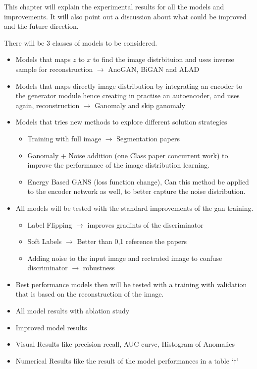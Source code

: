This chapter will explain the experimental results for all the models and improvements. It will also
point out a discussion about what could be improved and the future direction.

There will be 3 classes of models to be considered. 
\begin{itemize}
    \item Models that maps $z$ to $x$ to find the image distrbituion and uses inverse sample for
    reconstruction $\rightarrow$ AnoGAN, BiGAN and ALAD
    \item Models that maps directly image distribution by integrating an encoder to the generator
    module hence creating in practise an autoencoder, and uses again, reconstruction $\rightarrow$
    Ganomaly and skip ganomaly
    \item Models that tries new methods to explore different solution strategies \begin{itemize}
        \item Training with full image $\rightarrow$ Segmentation papers
        \item Ganomaly + Noise addition (one Class paper concurrent work) to improve the performance
        of the image distribution learning.
        \item Energy Based GANS (loss function change), Can this method be applied to the encoder
        network as well, to better capture the noise distribution.
    \end{itemize}
\end{itemize}

\begin{itemize}
    \item All models will be tested with the standard improvements of the gan training. \begin{itemize}
        \item Label Flipping $\rightarrow$ improves gradints of the discriminator
        \item Soft Labels $\rightarrow$ Better than 0,1 reference the papers
        \item Adding noise to the input image and rectrated image to confuse discriminator
        $\rightarrow$ robustness
    \end{itemize}
    \item Best performance models then will be tested with a training with validation that is based
    on the reconstruction of the image. 
    \item All model results with ablation study
    \item Improved model results
    \item Visual Results like precision recall, AUC curve, Histogram of Anomalies
    \item Numerical Results like the result of the model performances in a table `†'
\end{itemize}

\endgroup
